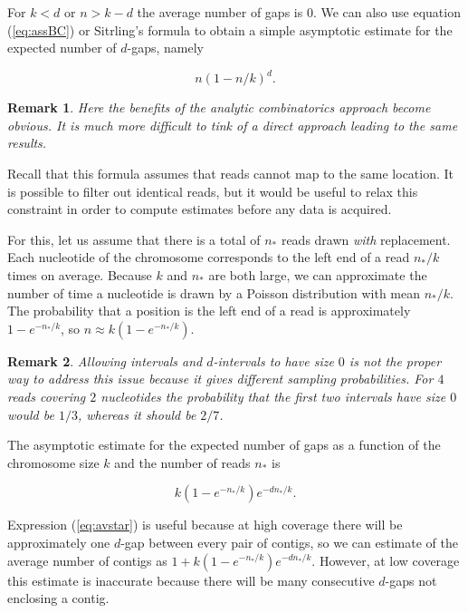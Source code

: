 \documentclass{article}
\newtheorem{remark}{Remark}
\begin{document}
For $k < d$ or $n > k-d$ the average number of gaps is $0$.  We can also
use equation (\ref{eq:assBC}) or Sitrling's formula to obtain a simple
asymptotic estimate for the expected number of $d$-gaps, namely

\begin{equation*}
n\left(1-n/k\right)^d.
\end{equation*}

\begin{remark}
Here the benefits of the analytic combinatorics approach become obvious.
It is much more difficult to tink of a direct approach leading to the same
results.
\end{remark}

Recall that this formula assumes that reads cannot map to the same
location. It is possible to filter out identical reads, but it would be
useful to relax this constraint in order to compute estimates before any
data is acquired.

For this, let us assume that there is a total of $n_*$ reads drawn
\emph{with} replacement. Each nucleotide of the chromosome corresponds to
the left end of a read $n_*/k$ times on average. Because $k$ and $n_*$ are
both large, we can approximate the number of time a nucleotide is drawn by
a Poisson distribution with mean $n_*/k$. The probability that a position
is the left end of a read is approximately $1-e^{-n_*/k}$, so $n \approx
k(1-e^{-n_*/k})$.

\begin{remark}
Allowing intervals and $d$-intervals to have size $0$ is not the proper
way to address this issue because it gives different sampling
probabilities.  For $4$ reads covering $2$ nucleotides the probability
that the first two intervals have size $0$ would be $1/3$, whereas it
should be $2/7$.
\end{remark}

The asymptotic estimate for the expected number of gaps as a function of
the chromosome size $k$ and the number of reads $n_*$ is

\begin{equation}
\label{eq:avstar}
k(1-e^{-n_*/k})e^{-dn_*/k}.
\end{equation}

Expression (\ref{eq:avstar}) is useful because at high coverage there will
be approximately one $d$-gap between every pair of contigs, so we can
estimate of the average number of contigs as $1 + k(1-e^{-n_*/k})
e^{-dn_*/k}$. However, at low coverage this estimate is inaccurate
because there will be many consecutive $d$-gaps not enclosing a contig.
\end{document}
